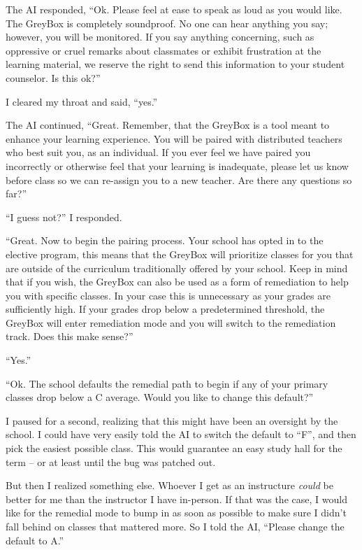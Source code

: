The AI responded, ``Ok. Please feel at ease to speak as loud as you would like. The GreyBox is completely soundproof. No one can hear anything you say; however, you will be monitored. If you say anything concerning, such as oppressive or cruel remarks about classmates or exhibit frustration at the learning material, we reserve the right to send this information to your student counselor. Is this ok?''

I cleared my throat and said, ``yes.''

The AI continued, ``Great. Remember, that the GreyBox is a tool meant to enhance your learning experience. You will be paired with distributed teachers who best suit you, as an individual. If you ever feel we have paired you incorrectly or otherwise feel that your learning is inadequate, please let us know before class so we can re-assign you to a new teacher. Are there any questions so far?''

``I guess not?'' I responded.

``Great. Now to begin the pairing process. Your school has opted in to the elective program, this means that the GreyBox will prioritize classes for you that are outside of the curriculum traditionally offered by your school. Keep in mind that if you wish, the GreyBox can also be used as a form of remediation to help you with specific classes. In your case this is unnecessary as your grades are sufficiently high. If your grades drop below a predetermined threshold, the GreyBox will enter remediation mode and you will switch to the remediation track. Does this make sense?''

``Yes.''

``Ok. The school defaults the remedial path to begin if any of your primary classes drop below a C average. Would you like to change this default?''

I paused for a second, realizing that this might have been an oversight by the school.
I could have very easily told the AI to switch the default to ``F'', and then pick the easiest possible class.
This would guarantee an easy study hall for the term -- or at least until the bug was patched out.

But then I realized something else.
Whoever I get as an instructure \textit{could} be better for me than the instructor I have in-person.
If that was the case, I would like for the remedial mode to bump in as soon as possible to make sure I didn't fall behind on classes that mattered more.
So I told the AI, ``Please change the default to A.''

